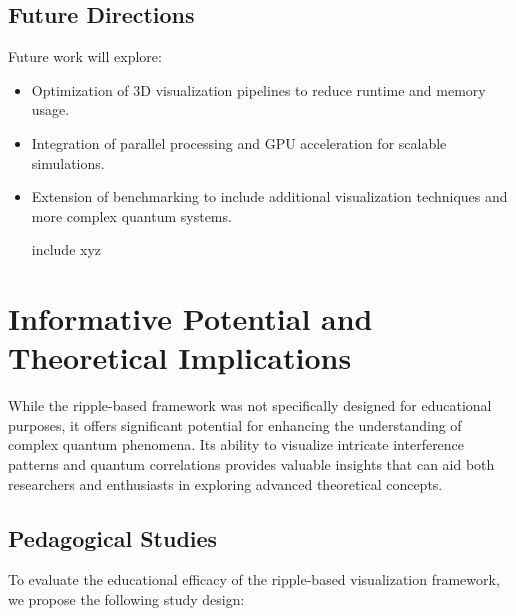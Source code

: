 \documentclass[12pt]{article}
\begin{document}
\subsection{Future Directions}

Future work will explore:
\begin{itemize}
    \item Optimization of 3D visualization pipelines to reduce runtime and memory usage.
    \item Integration of parallel processing and GPU acceleration for scalable simulations.
    \item Extension of benchmarking to include additional visualization techniques and more complex quantum systems.
    \item [include xyz]
\end{itemize}

\section{Informative Potential and Theoretical Implications}

While the ripple-based framework was not specifically designed for educational purposes, it offers significant potential for enhancing the understanding of complex quantum phenomena. Its ability to visualize intricate interference patterns and quantum correlations provides valuable insights that can aid both researchers and enthusiasts in exploring advanced theoretical concepts.

\subsection{Pedagogical Studies}

To evaluate the educational efficacy of the ripple-based visualization framework, we propose the following study design:
\end{document}
